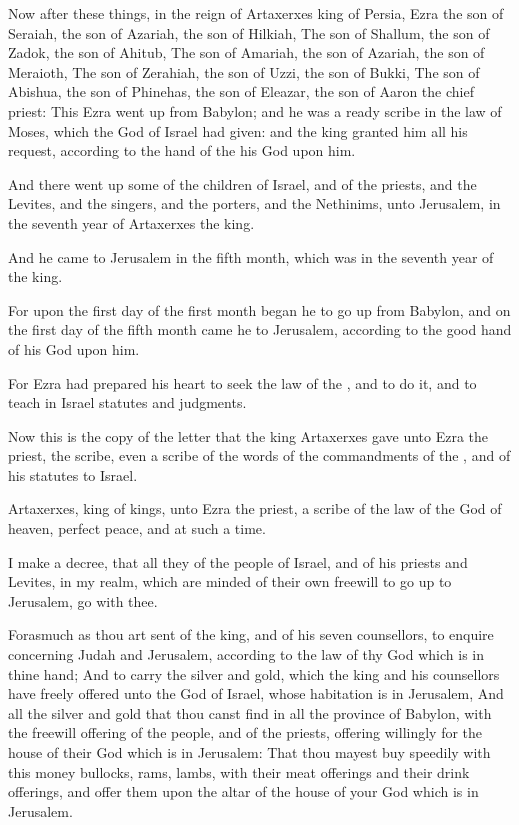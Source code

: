 \Chapter
\Verse Now after these things, in the reign of Artaxerxes king of Persia, Ezra the son of Seraiah, the son of Azariah, the son of Hilkiah, \Verse The son of Shallum, the son of Zadok, the son of Ahitub, \Verse The son of Amariah, the son of Azariah, the son of Meraioth, \Verse The son of Zerahiah, the son of Uzzi, the son of Bukki, \Verse The son of Abishua, the son of Phinehas, the son of Eleazar, the son of Aaron the chief priest: \Verse This Ezra went up from Babylon; and he was a ready scribe in the law of Moses, which the \LORD God of Israel had given: and the king granted him all his request, according to the hand of the \LORD his God upon him.

\Verse And there went up some of the children of Israel, and of the priests, and the Levites, and the singers, and the porters, and the Nethinims, unto Jerusalem, in the seventh year of Artaxerxes the king.

\Verse And he came to Jerusalem in the fifth month, which was in the seventh year of the king.

\Verse For upon the first day of the first month began he to go up from Babylon, and on the first day of the fifth month came he to Jerusalem, according to the good hand of his God upon him.

\Verse For Ezra had prepared his heart to seek the law of the \LORD, and to do it, and to teach in Israel statutes and judgments.

\Verse Now this is the copy of the letter that the king Artaxerxes gave unto Ezra the priest, the scribe, even a scribe of the words of the commandments of the \LORD, and of his statutes to Israel.

\Verse Artaxerxes, king of kings, unto Ezra the priest, a scribe of the law of the God of heaven, perfect peace, and at such a time.

\Verse I make a decree, that all they of the people of Israel, and of his priests and Levites, in my realm, which are minded of their own freewill to go up to Jerusalem, go with thee.

\Verse Forasmuch as thou art sent of the king, and of his seven counsellors, to enquire concerning Judah and Jerusalem, according to the law of thy God which is in thine hand; \Verse And to carry the silver and gold, which the king and his counsellors have freely offered unto the God of Israel, whose habitation is in Jerusalem, \Verse And all the silver and gold that thou canst find in all the province of Babylon, with the freewill offering of the people, and of the priests, offering willingly for the house of their God which is in Jerusalem: \Verse That thou mayest buy speedily with this money bullocks, rams, lambs, with their meat offerings and their drink offerings, and offer them upon the altar of the house of your God which is in Jerusalem.

